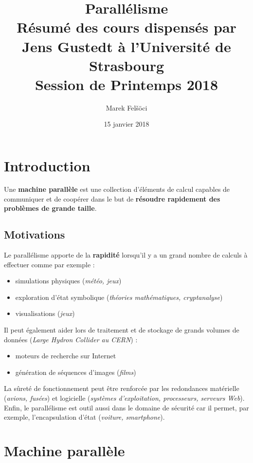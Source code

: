 \documentclass[12pt, a4paper]{article}
\title{%
  \textbf{Parallélisme} \\
  \Large Résumé des cours dispensés par Jens Gustedt à l'Université de
  Strasbourg \\
  \large Session de Printemps 2018
}
\author{Marek Felšöci}
\date{15 janvier 2018}
\begin{document}
  \maketitle
  \newpage
  \section{Introduction}
    Une \textbf{machine parallèle} est une collection d'éléments de calcul
    capables de communiquer et de coopérer dans le but de \textbf{résoudre
    rapidement des problèmes de grande taille}.
    \subsection{Motivations}
      Le parallélisme apporte de la \textbf{rapidité} lorsqu'il y a un grand
      nombre de calculs à effectuer comme par exemple :
      \begin{itemize}
        \item simulations physiques (\textit{météo, jeux})
        \item exploration d'état symbolique (\textit{théories mathématiques,
        cryptanalyse})
        \item visualisations (\textit{jeux})
      \end{itemize}
      Il peut également aider lors de traitement et de stockage de grands
      volumes de données (\textit{Large Hydron Collider au CERN}) :
      \begin{itemize}
        \item moteurs de recherche sur Internet
        \item génération de séquences d'images (\textit{films})
      \end{itemize}
      La sûreté de fonctionnement peut être renforcée par les redondances
      matérielle (\textit{avions, fusées}) et logicielle (\textit{systèmes
      d'exploitation, processeurs, serveurs Web}). Enfin, le parallélisme est
      outil aussi dans le domaine de sécurité car il permet, par exemple,
      l'encapsulation d'état (\textit{voiture, smartphone}).
  \section{Machine parallèle}
\end{document}
